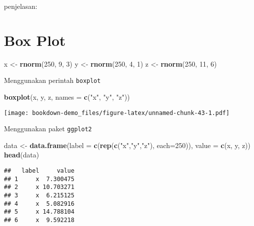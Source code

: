 \documentclass[
]{book}
\newenvironment{Shaded}{\begin{snugshade}}{\end{snugshade}}
\newcommand{\DataTypeTok}[1]{\textcolor[rgb]{0.13,0.29,0.53}{#1}}
\newcommand{\DecValTok}[1]{\textcolor[rgb]{0.00,0.00,0.81}{#1}}
\newcommand{\KeywordTok}[1]{\textcolor[rgb]{0.13,0.29,0.53}{\textbf{#1}}}
\newcommand{\NormalTok}[1]{#1}
\newcommand{\StringTok}[1]{\textcolor[rgb]{0.31,0.60,0.02}{#1}}
\begin{document}
penjelasan:

\hypertarget{box-plot}{%
\section{Box Plot}\label{box-plot}}

\begin{Shaded}
\begin{Highlighting}[]
\NormalTok{x <-}\StringTok{ }\KeywordTok{rnorm}\NormalTok{(}\DecValTok{250}\NormalTok{, }\DecValTok{9}\NormalTok{, }\DecValTok{3}\NormalTok{)}
\NormalTok{y <-}\StringTok{ }\KeywordTok{rnorm}\NormalTok{(}\DecValTok{250}\NormalTok{, }\DecValTok{4}\NormalTok{, }\DecValTok{1}\NormalTok{)}
\NormalTok{z <-}\StringTok{ }\KeywordTok{rnorm}\NormalTok{(}\DecValTok{250}\NormalTok{, }\DecValTok{11}\NormalTok{, }\DecValTok{6}\NormalTok{)}
\end{Highlighting}
\end{Shaded}

Menggunakan perintah \texttt{boxplot}

\begin{Shaded}
\begin{Highlighting}[]
\KeywordTok{boxplot}\NormalTok{(x, y, z,}
        \DataTypeTok{names =} \KeywordTok{c}\NormalTok{(}\StringTok{"x"}\NormalTok{, }\StringTok{"y"}\NormalTok{, }\StringTok{"z"}\NormalTok{))}
\end{Highlighting}
\end{Shaded}

\texttt{[image: bookdown-demo\_files/figure-latex/unnamed-chunk-43-1.pdf]}

Menggunakan paket \texttt{ggplot2}

\begin{Shaded}
\begin{Highlighting}[]
\NormalTok{data <-}\StringTok{ }\KeywordTok{data.frame}\NormalTok{(}\DataTypeTok{label =} \KeywordTok{c}\NormalTok{(}\KeywordTok{rep}\NormalTok{(}\KeywordTok{c}\NormalTok{(}\StringTok{"x"}\NormalTok{,}\StringTok{"y"}\NormalTok{,}\StringTok{"z"}\NormalTok{),}
                                 \DataTypeTok{each=}\DecValTok{250}\NormalTok{)),}
                   \DataTypeTok{value =} \KeywordTok{c}\NormalTok{(x, y, z))}
\KeywordTok{head}\NormalTok{(data)}
\end{Highlighting}
\end{Shaded}

\begin{verbatim}
##   label     value
## 1     x  7.300475
## 2     x 10.703271
## 3     x  6.215125
## 4     x  5.082916
## 5     x 14.788104
## 6     x  9.592218
\end{verbatim}
\end{document}
